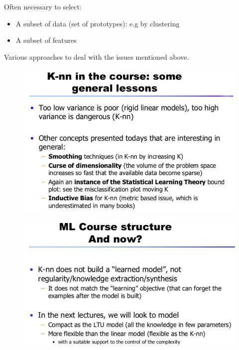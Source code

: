 \documentclass[../main.tex]{subfiles}
\begin{document}
Often necessary to select:
\begin{itemize}
    \item A subset of data (set of prototypes): e.g by clustering
    \item A subset of features
\end{itemize}
Various approaches to deal with the issues mentioned above.
\newpage
\begin{figure}[H]
    \centering
    \includegraphics[scale = 0.5]{lectures/3_K_nn/3_knn_end1.png}
\end{figure}

\begin{figure}[H]
    \centering
    \includegraphics[scale = 0.5]{lectures/3_K_nn/3_knn_end2.png}
\end{figure}
\end{document}
